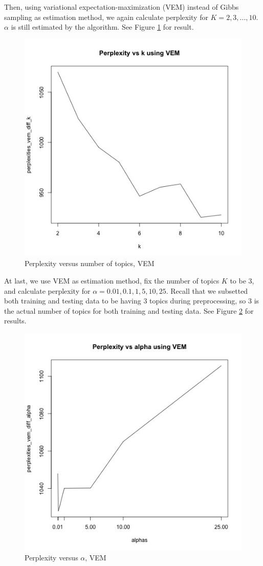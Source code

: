 \documentclass{article}
\begin{document}
Then, using variational expectation-maximization (VEM) instead of Gibbs sampling as estimation method, we again calculate perplexity for $K = 2, 3, ..., 10$. $\alpha$ is still estimated by the algorithm. See Figure \ref{fig:vem_diff_k_10} for result.

\begin{figure}[h]
  \centering
  \includegraphics[width=0.5\linewidth]{images/vem_diff_k.jpg}
  \caption{Perplexity versus number of topics, VEM}
  \label{fig:vem_diff_k_10}
\end{figure}

At last, we use VEM as estimation method, fix the number of topics $K$ to be 3, and calculate perplexity for $\alpha = 0.01, 0.1, 1, 5, 10, 25$. Recall that we subsetted both training and testing data to be having 3 topics during preprocessing, so 3 is the actual number of topics for both training and testing data. See Figure \ref{fig:vem_diff_alpha} for results.

\begin{figure}[h]
  \centering
  \includegraphics[width=0.5\linewidth]{images/vem_diff_alpha.jpg}
  \caption{Perplexity versus $\alpha$, VEM}
  \label{fig:vem_diff_alpha}
\end{figure}
\end{document}
